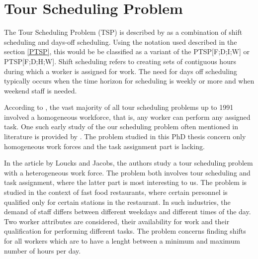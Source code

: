 
 

%
%
%
%


\section{Tour Scheduling Problem}\label{TSP}

The Tour Scheduling Problem (TSP) is described by \citet{loucks_1991} as a combination of shift scheduling and days-off scheduling. Using the notation used described in the section \ref{PTSP}, this would be be classified as a variant of the PTSP[F;D;I;W] or PTSP[F;D;H;W]. Shift scheduling refers to creating sets of contiguous hours during which a worker is assigned for work. The need for days off scheduling typically occurs when the time horizon for scheduling is weekly or more and when weekend staff is needed.

According to \citet{loucks_1991}, the vast majority of all tour scheduling problems up to 1991 involved a homogeneous workforce, that is, any worker can perform any assigned task. One such early study of the our scheduling problem often mentioned in literature is provided by \citet{thompson_1988}. The problem studied in this PhD thesis concern only homogeneous work forces and the task assignment part is lacking.

In the article by Loucks and Jacobs, the authors study a tour scheduling problem with a heterogeneous work force. The problem both involves tour scheduling and task assignment, where the latter part is most interesting to us. The problem is studied in the context of fast food restaurants, where certain personnel is qualified only for certain stations in the restaurant. In such industries, the demand of staff differs between different weekdays and different times of the day. Two worker attributes are considered, their availability for work and their qualification for performing different tasks. The problem concerns finding shifts for all workers which are to have a lenght between a minimum and maximum number of hours per day.

